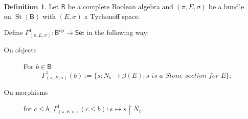 \documentclass[11pt]{amsart}
\newcommand{\etale}{\textrm{Etale}}
\newcommand{\hetale}{\textrm{H-Etale}}
\theoremstyle{plain}
\theoremstyle{definition}
\newtheorem{definition}[theorem]{Definition}
\theoremstyle{plain}
\theoremstyle{remark}
\newcommand{\dSet}{\mathsf{Set}}
\DeclareMathOperator{\St}{St}
\newcommand{\bool}[1]{\mathsf{#1}}
\newcommand{\0}{\mathsf{0}}
\renewcommand{\1}{\mathsf{1}}
\renewcommand{\2}{\mathsf{2}}
\theoremstyle{definition}
\begin{document}
\begin{definition}
\label{def:gammapi}
 Let $\bool{B}$ be a complete Boolean algebra and
$(\pi,E,\sigma)$ be a bundle on $\St(\bool{B})$ with $(E,\sigma)$ a Tychonoff space.

Define $\Gamma^1_{(\pi,E,\sigma)}:\bool{B}^\mathrm{op}\to\dSet$ in the following way:
\begin{description}
\item[On objects] For $b\in\bool{B}$
\[
\Gamma^1_{(\pi,E,\sigma)}(b):=\{s:N_b\to \beta(E): s \textit{ is a Stone section for $E$}\};
\]
\item[On morphisms]
for $c\leq b$, $\Gamma^1_{(\pi,E,\sigma)}(c\leq b):s\mapsto s\restriction N_c$.

\end{description}
\end{definition}
\end{document}

